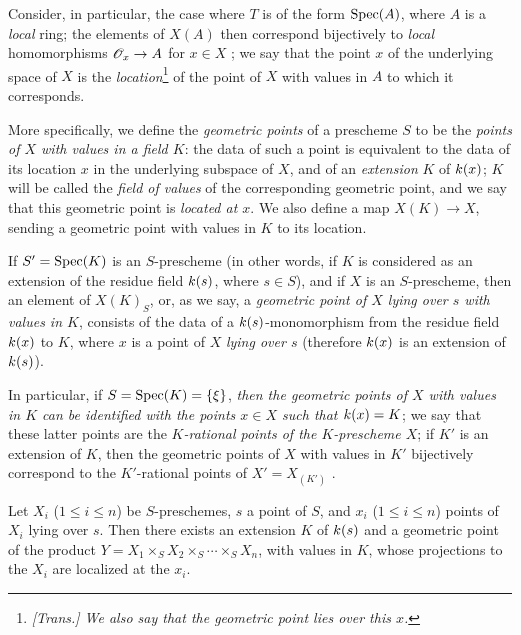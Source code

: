 \begin{env}[3.4.5]
\label{1.3.4.5}
Consider, in particular, the case where $T$ is of the form ${\mathop{\mathrm{Spec}}\nolimits}(A)$, where $A$ is a
\emph{local} ring; the elements of $X(A)$ then correspond bijectively to \emph{local}
homomorphisms $\OO_x\to A$ for $x\in X$ ; we say that the
point $x$ of the underlying space of $X$ is the \emph{location}\footnote{\emph{[Trans.] We also say that
\emph{the geometric point lies over this $x$}.}} of the point of $X$ with values in $A$ to which it corresponds.

More specifically, we define the \emph{geometric points} of a prescheme $S$ to be the \emph{points of
$X$ with values in a field $K$}: the data of such a point is equivalent to the data of its
location $x$ in the underlying subspace of $X$, and of an \emph{extension} $K$ of $k(x)$;
$K$ will be called the \emph{field of values} of the corresponding geometric point, and we
say that this geometric point is \emph{located at $x$}. We also define a map $X(K)\to X$,
sending a geometric point with values in $K$ to its location.

If $S'={\mathop{\mathrm{Spec}}\nolimits}(K)$ is an $S$-prescheme (in other words, if $K$ is considered as an extension
of the residue field $k(s)$, where $s\in S$), and if $X$ is an $S$-prescheme, then an
element of $X(K)_S$, or, as we say, a \emph{geometric point of $X$ lying over $s$ with values
in $K$}, consists of the data of a $k(s)$-monomorphism from the residue field $k(x)$
to $K$, where $x$ is a point of $X$ \emph{lying over $s$} (therefore $k(x)$ is an
extension of $k(s)$).

In particular, if $S={\mathop{\mathrm{Spec}}\nolimits}(K)=\{\xi\}$, \emph{then the geometric points of $X$ with values in
$K$ can be identified with the points $x\in X$ such that $k(x)=K$}; we say that these latter
points are the \emph{$K$-rational points of the $K$-prescheme $X$}; if $K'$ is an extension
of $K$, then the geometric points of $X$ with values in $K'$ bijectively correspond to the
$K'$-rational points of $X'=X_{(K')}$ .
\end{env}

\begin{lem}[3.4.6]
\label{1.3.4.6}
Let $X_i$ ($1\leq i\leq n$) be $S$-preschemes, $s$ a point of $S$, and $x_i$
($1\leq i\leq n$) points of $X_i$ lying over $s$. Then there exists an extension
$K$ of $k(s)$ and a geometric point of the product
$Y=X_1\times_S X_2\times_S\cdots\times_S X_n$, with values in $K$, whose projections to
the $X_i$ are localized at the $x_i$.
\end{lem}

